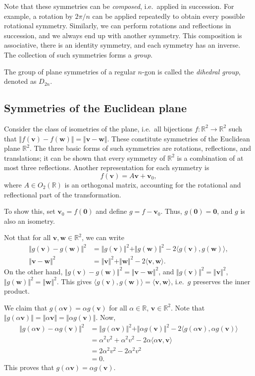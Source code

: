 \documentclass[11pt]{article}
\newcommand{\R}{\mathbb{R}}
\renewcommand{\vec}[1]{\boldsymbol{#1}}
\newcommand{\vv}{\vec{v}}
\newcommand{\vw}{\vec{w}}
\newcommand{\norm}[1]{\Vert #1 \Vert}
\newcommand{\ip}[2]{\langle #1, #2 \rangle}
\theoremstyle{definition}
\theoremstyle{remark}
\numberwithin{equation}{section}
\begin{document}
    Note that these symmetries can be \emph{composed}, i.e.\ applied in succession.
    For example, a rotation by $2\pi / n$ can be applied repeatedly to obtain every
    possible rotational symmetry. Similarly, we can perform rotations and reflections
    in succession, and we always end up with another symmetry. This composition is
    associative, there is an identity symmetry, and each symmetry has an inverse.
    The collection of such symmetries forms a \emph{group}.

    The group of plane symmetries of a regular $n$-gon is called the \emph{dihedral
    group}, denoted as $D_{2n}$.

    \subsection{Symmetries of the Euclidean plane}
    Consider the class of isometries of the plane, i.e.\ all bijections $f\colon \R^2
    \to \R^2$ such that $\norm{f(\vv) - f(\vw)} = \norm{\vv - \vw}$. These constitute
    symmetries of the Euclidean plane $\R^2$. The three basic forms of such
    symmetries are rotations, reflections, and translations; it can be shown that
    every symmetry of $\R^2$ is a combination of at most three reflections.  Another
    representation for each symmetry is \[
        f(\vv) = A\vv + \vv_0,
    \] where $A \in O_2(\R)$ is an orthogonal matrix, accounting for the rotational
    and reflectional part of the transformation.

    To show this, set $\vv_0 = f(\vec{0})$ and define $g = f - \vv_0$. Thus,
    $g(\vec{0}) = \vec{0}$, and $g$ is also an isometry.
    
    Not that for all $\vv, \vw \in \R^2$, we can write
    \begin{align*}
        \norm{g(\vv) - g(\vw)}^2 &= \norm{g(\vv)}^2 + \norm{g(\vw)}^2 -
        2\ip{g(\vv)}{g(\vw)}, \\
        \norm{\vv - \vw}^2 &= \norm{\vv}^2 + \norm{\vw}^2 -
        2\ip{\vv}{\vw}.
    \end{align*}
    On the other hand, $\norm{g(\vv) - g(\vw)}^2 = \norm{\vv - \vw}^2$, and
    $\norm{g(\vv)}^2 = \norm{\vv}^2$, $\norm{g(\vw)}^2 = \norm{\vw}^2$. This gives
    $\ip{g(\vv)}{g(\vw)} = \ip{\vv}{\vw}$, i.e.\ $g$ preserves the inner product.

    We claim that $g(\alpha\vv) = \alpha g(\vv)$ for all $\alpha \in \R$, $\vv
    \in \R^2$. Note that $\norm{g(\alpha\vv)} = \norm{\alpha\vv} = \norm{\alpha g(\vv)}$.
    Now,
    \begin{align*}
        \norm{g(\alpha\vv) - \alpha g(\vv)}^2 &= \norm{g(\alpha\vv)}^2 + \norm{\alpha
        g(\vv)}^2 - 2\ip{g(\alpha\vv)}{\alpha g(\vv)} \\
        &= \alpha^2v^2 + \alpha^2v^2 - 2\alpha\ip{\alpha\vv}{\vv} \\
        &= 2\alpha^2v^2 - 2\alpha^2v^2 \\
        &= 0.
    \end{align*}    
    This proves that $g(\alpha\vv) = \alpha g(\vv)$.
\end{document}

